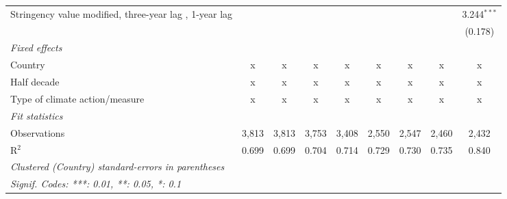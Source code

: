 \begin{table}[htbp]
\begin{tabular}{lcccccccc}
      Stringency value modified, three-year lag , 1-year lag                      &               &               &               &              &             &              &              & 3.244$^{***}$\\   
                                                                                  &               &               &               &              &             &              &              & (0.178)\\   
      \emph{Fixed effects}\\
      Country                                                                     & x             & x             & x             & x            & x           & x            & x            & x\\  
      Half decade                                                                 & x             & x             & x             & x            & x           & x            & x            & x\\  
      Type of climate action/measure                                              & x             & x             & x             & x            & x           & x            & x            & x\\  
      \midrule \emph{Fit statistics}\\
      Observations                                                                & 3,813         & 3,813         & 3,753         & 3,408        & 2,550       & 2,547        & 2,460        & 2,432\\  
      R$^2$                                                                       & 0.699         & 0.699         & 0.704         & 0.714        & 0.729       & 0.730        & 0.735        & 0.840\\  
      \midrule
      \multicolumn{9}{l}{\emph{Clustered (Country) standard-errors in parentheses}}\\
      \multicolumn{9}{l}{\emph{Signif. Codes: ***: 0.01, **: 0.05, *: 0.1}}\\
   \end{tabular}
\end{table}


